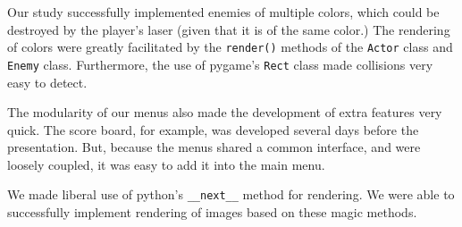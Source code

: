 Our study successfully implemented enemies of multiple
colors, which could be destroyed by the player's laser
(given that it is of the same color.)  The rendering of
colors were greatly facilitated by the
\texttt{render()} methods of the
\texttt{Actor} class and \texttt{Enemy}
class.  Furthermore, the use of pygame's \texttt{Rect}
class made collisions very easy to detect.

The modularity of our menus also made the development of
extra features very quick.  The score board, for example,
was developed several days before the presentation.  But,
because the menus shared a common interface, and were
loosely coupled, it was easy to add it into the main menu.

We made liberal use of python's \texttt{__next__}
method for rendering.  We were able to successfully implement
rendering of images based on these magic methods.
